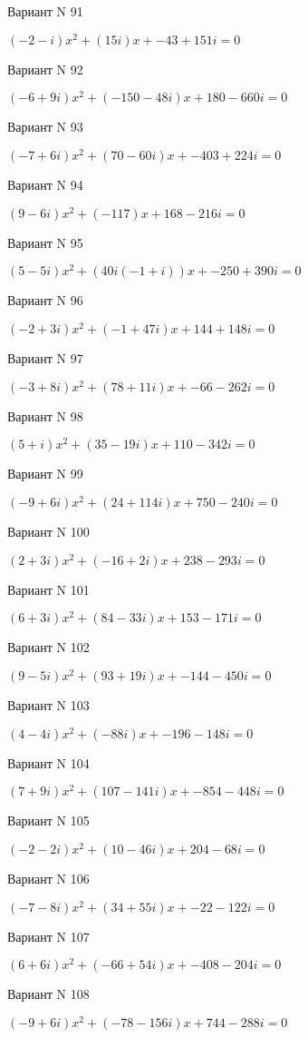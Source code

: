 \documentclass[11pt]{report}
\begin{document}
Вариант N 91

$(-2 - i)x^2 + (15 i)x + -43 + 151 i = 0$

Вариант N 92

$(-6 + 9 i)x^2 + (-150 - 48 i)x + 180 - 660 i = 0$

Вариант N 93

$(-7 + 6 i)x^2 + (70 - 60 i)x + -403 + 224 i = 0$

Вариант N 94

$(9 - 6 i)x^2 + (-117)x + 168 - 216 i = 0$

Вариант N 95

$(5 - 5 i)x^2 + (40 i \left(-1 + i\right))x + -250 + 390 i = 0$

Вариант N 96

$(-2 + 3 i)x^2 + (-1 + 47 i)x + 144 + 148 i = 0$

Вариант N 97

$(-3 + 8 i)x^2 + (78 + 11 i)x + -66 - 262 i = 0$

Вариант N 98

$(5 + i)x^2 + (35 - 19 i)x + 110 - 342 i = 0$

Вариант N 99

$(-9 + 6 i)x^2 + (24 + 114 i)x + 750 - 240 i = 0$

Вариант N 100

$(2 + 3 i)x^2 + (-16 + 2 i)x + 238 - 293 i = 0$

Вариант N 101

$(6 + 3 i)x^2 + (84 - 33 i)x + 153 - 171 i = 0$

Вариант N 102

$(9 - 5 i)x^2 + (93 + 19 i)x + -144 - 450 i = 0$

Вариант N 103

$(4 - 4 i)x^2 + (- 88 i)x + -196 - 148 i = 0$

Вариант N 104

$(7 + 9 i)x^2 + (107 - 141 i)x + -854 - 448 i = 0$

Вариант N 105

$(-2 - 2 i)x^2 + (10 - 46 i)x + 204 - 68 i = 0$

Вариант N 106

$(-7 - 8 i)x^2 + (34 + 55 i)x + -22 - 122 i = 0$

Вариант N 107

$(6 + 6 i)x^2 + (-66 + 54 i)x + -408 - 204 i = 0$

Вариант N 108

$(-9 + 6 i)x^2 + (-78 - 156 i)x + 744 - 288 i = 0$
\end{document}
